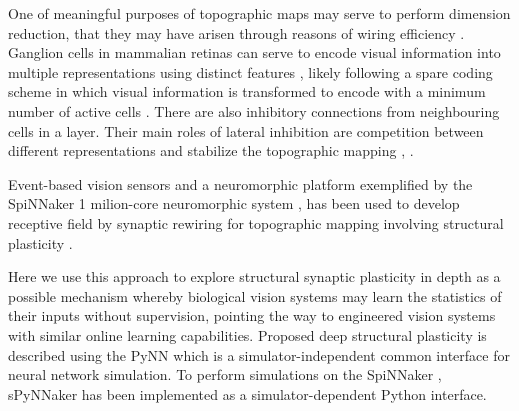 \documentclass[letterpaper, 10 pt, conference]{ieeeconf}  %
\begin{document}
One of meaningful purposes of topographic maps may serve to perform dimension reduction, that they may have arisen through reasons of wiring efficiency \cite{bamford2010synaptic}.
Ganglion cells in mammalian retinas can serve to encode visual information into multiple representations using distinct features \cite{roska2014retina}, likely following a spare coding scheme in which visual information is transformed to encode with a minimum number of active cells \cite{Field1994}.
There are also inhibitory connections from neighbouring cells in a layer. Their main roles of lateral inhibition are competition between different representations and stabilize the topographic mapping \cite{Kisvarday1994}, \cite{mauss2015neural}.

Event-based vision sensors \cite{gray1989oscillatory} and a neuromorphic platform exemplified by the SpiNNaker 1 milion-core neuromorphic system \cite{bogdan2018structural}, \cite{Furber2020} has been used to develop receptive field by synaptic rewiring for topographic mapping involving structural plasticity \cite{hopkins2018spiking}.

Here we use this approach to explore structural synaptic plasticity in depth as a possible mechanism whereby biological vision systems may learn the statistics of their inputs without supervision, pointing the way to engineered vision systems with similar online learning capabilities.
Proposed deep structural plasticity is described using the PyNN \cite{davison2009pynn} which is a simulator-independent common interface for neural network simulation. To perform simulations on the SpiNNaker \cite{Furber2020},  sPyNNaker \cite{rhodes2018spynnaker} has been implemented as a simulator-dependent Python interface.

\end{document}
